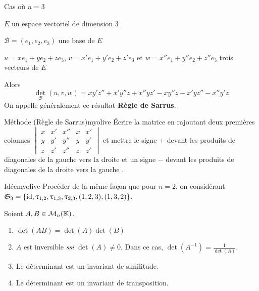     \begin{prop}{Cas où $n=3$}{}
        \begin{soient}
            \item $E$ un espace vectoriel de dimension $3$
            \item $\mathcal{B} = (e_1,e_2,e_3)$ une base de $E$
            \item $u = xe_1 + ye_2 + ze_3$, $v = x'e_1 + y'e_2 + z'e_3$ et $w = x'' e_1 + y''e_2 + z''e_3$ trois vecteurs de $E$
        \end{soient}
        Alors \[ \det_{\mathcal{B}}(u,v,w) = xy'z'' + x'y''z + x''yz' - xy''z - x'yz'' - x''y'z \]
        On appelle généralement ce résultat \textbf{Règle de Sarrus}.
    \end{prop}

    \begin{omed}{Méthode (Règle de Sarrus)}{myolive}
        Écrire la matrice en rajoutant deux premières colonnes $\begin{vmatrix}
            x & x' & x'' & x & x' \\
            y & y' & y'' & y & y'\\
            z & z' & z'' & z & z' 
        \end{vmatrix}$
        et mettre le signe $+$ devant les produits de diagonales de la gauche vers la droite  et un signe $-$ devant les produits de diagonales de la droite vers la gauche .
    \end{omed}

    \begin{demo}{Idée}{myolive}
        Procéder de la même façon que pour $n = 2$, on considérant $\mathfrak{S}_3 = \left\{\operatorname{id}, \uptau_{1,2}, \uptau_{1,3}, \uptau_{2,3}, (1,2,3), (1,3,2)\right\}$.
    \end{demo}

    \begin{prop}{}{}
        Soient $A,B \in \mathcal{M}_{n}(\mathbb{K})$.
        \begin{enumerate}
            \item $\det(AB) = \det(A)\det(B)$
            \item $A$ est inversible \textit{ssi} $\det(A) \neq 0$. Dans ce cas, $\det(A^{-1}) = \frac{1}{\det(A)}$.
            \item Le déterminant est un invariant de similitude.
            \item Le déterminant est un invariant de transposition. 
        \end{enumerate}
    \end{prop}

